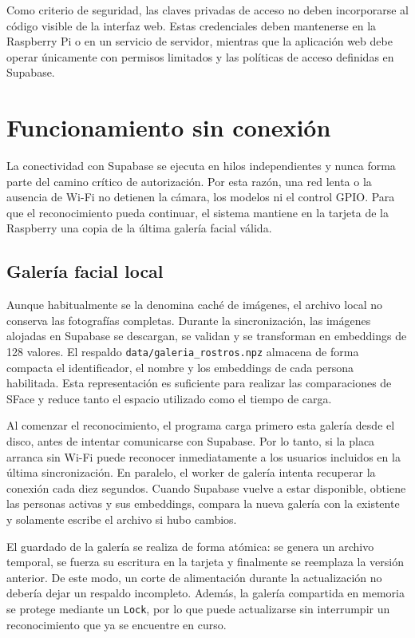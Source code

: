 Como criterio de seguridad, las claves privadas de acceso no deben incorporarse al código visible de la interfaz web. Estas credenciales deben mantenerse en la Raspberry Pi o en un servicio de servidor, mientras que la aplicación web debe operar únicamente con permisos limitados y las políticas de acceso definidas en Supabase.

\section{Funcionamiento sin conexión}
\label{sec:offline}

La conectividad con Supabase se ejecuta en hilos independientes y nunca forma parte del camino crítico de autorización. Por esta razón, una red lenta o la ausencia de Wi-Fi no detienen la cámara, los modelos ni el control GPIO. Para que el reconocimiento pueda continuar, el sistema mantiene en la tarjeta de la Raspberry una copia de la última galería facial válida.

\subsection{Galería facial local}

Aunque habitualmente se la denomina caché de imágenes, el archivo local no conserva las fotografías completas. Durante la sincronización, las imágenes alojadas en Supabase se descargan, se validan y se transforman en embeddings de 128 valores. El respaldo \texttt{data/galeria\_rostros.npz} almacena de forma compacta el identificador, el nombre y los embeddings de cada persona habilitada. Esta representación es suficiente para realizar las comparaciones de SFace y reduce tanto el espacio utilizado como el tiempo de carga.

Al comenzar el reconocimiento, el programa carga primero esta galería desde el disco, antes de intentar comunicarse con Supabase. Por lo tanto, si la placa arranca sin Wi-Fi puede reconocer inmediatamente a los usuarios incluidos en la última sincronización. En paralelo, el worker de galería intenta recuperar la conexión cada diez segundos. Cuando Supabase vuelve a estar disponible, obtiene las personas activas y sus embeddings, compara la nueva galería con la existente y solamente escribe el archivo si hubo cambios.

El guardado de la galería se realiza de forma atómica: se genera un archivo temporal, se fuerza su escritura en la tarjeta y finalmente se reemplaza la versión anterior. De este modo, un corte de alimentación durante la actualización no debería dejar un respaldo incompleto. Además, la galería compartida en memoria se protege mediante un \texttt{Lock}, por lo que puede actualizarse sin interrumpir un reconocimiento que ya se encuentre en curso.

